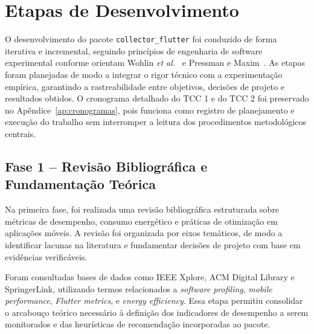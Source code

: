 \section{Etapas de Desenvolvimento}

O desenvolvimento do pacote \texttt{collector\_flutter} foi conduzido de forma iterativa e incremental, seguindo princípios de engenharia de software experimental conforme orientam Wohlin \textit{et al.}~\cite{wohlin2012} e Pressman e Maxim~\cite{pressman2020engenharia}.
As etapas foram planejadas de modo a integrar o rigor técnico com a experimentação empírica, garantindo a rastreabilidade entre objetivos, decisões de projeto e resultados obtidos.
O cronograma detalhado do TCC 1 e do TCC 2 foi preservado no Apêndice~\ref{ap:cronogramas}, pois funciona como registro de planejamento e execução do trabalho sem interromper a leitura dos procedimentos metodológicos centrais.

\subsection{Fase 1 – Revisão Bibliográfica e Fundamentação Teórica}

Na primeira fase, foi realizada uma revisão bibliográfica estruturada sobre métricas de desempenho, consumo energético e práticas de otimização em aplicações móveis.
A revisão foi organizada por eixos temáticos, de modo a identificar lacunas na literatura e fundamentar decisões de projeto com base em evidências verificáveis.

Foram consultadas bases de dados como IEEE Xplore, ACM Digital Library e SpringerLink, utilizando termos relacionados a \textit{software profiling}, \textit{mobile performance}, \textit{Flutter metrics}, e \textit{energy efficiency}.
Essa etapa permitiu consolidar o arcabouço teórico necessário à definição dos indicadores de desempenho a serem monitorados e das heurísticas de recomendação incorporadas ao pacote.
